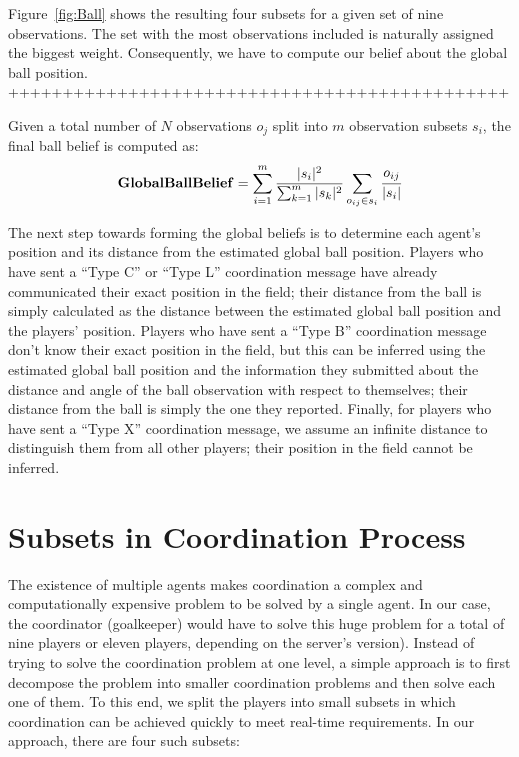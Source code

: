 Figure~\ref{fig:Ball} shows the resulting four subsets for a given set of nine observations. The set with the most observations included is naturally assigned the biggest weight. Consequently, we have to compute our belief about the global ball position.
++++++++++++++++++++++++++++++++++++++++++++++



Given a total number of $N$ observations $o_j$ split into $m$ observation subsets $s_i$, the final ball belief is computed as:
\begin{align*}
{\bf Global Ball Belief} = \sum_{i=1}^m \frac {|s_i|^2} {\sum_{k=1}^m |s_k|^2} \sum_{o_{ij} \in s_i} \cfrac{o_{ij}}{|s_i|}
\end{align*}


The next step towards forming the global beliefs is to determine each agent's position and its distance from the estimated global ball position. Players who have sent a ``Type C'' or ``Type L'' coordination message have already communicated their exact position in the field; their distance from the ball is simply calculated as the distance between the estimated global ball position and the players' position. Players who have sent a ``Type B'' coordination message don't know their exact position in the field, but this can be inferred using the estimated global ball position and the information they submitted about the distance and angle of the ball observation with respect to themselves; their distance from the ball is simply the one they reported. Finally, for players who have sent a ``Type X'' coordination message, we assume an infinite distance to distinguish them from all other players; their position in the field cannot be inferred. 


\section{Subsets in Coordination Process}
The existence of multiple agents makes coordination a complex and computationally expensive problem to be solved by a single agent. In our case, the coordinator (goalkeeper) would have to solve this huge problem for a total of nine players or eleven players, depending on the server's version).
Instead of trying to solve the coordination problem at one level, a simple approach is to first decompose the problem into smaller coordination problems and then solve each one of them. To this end, we split the players into small subsets in which coordination can be achieved quickly to meet real-time requirements. In our approach, there are four such subsets:

